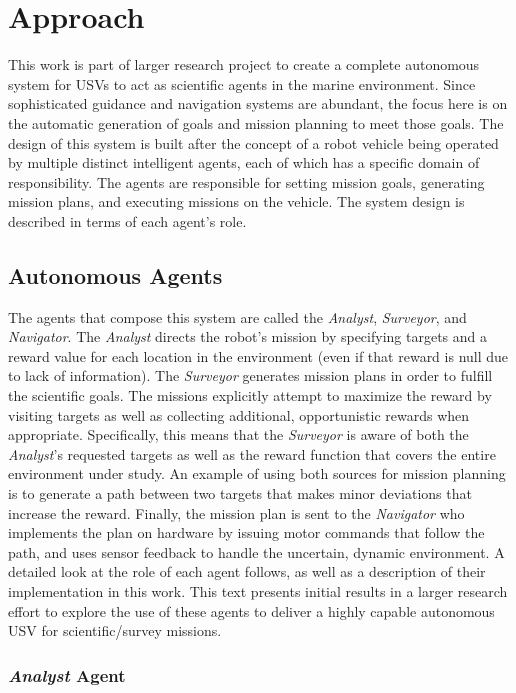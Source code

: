 \documentclass{tamuccthesis}
\begin{document}
\section{Approach}

This work is part of larger research project to create a complete autonomous system for USVs to act as scientific agents in the marine environment. Since sophisticated guidance and navigation systems are abundant, the focus here is on the automatic generation of goals and mission planning to meet those goals. The design of this system is built after the concept of a robot vehicle being operated by multiple distinct intelligent agents, each of which has a specific domain of responsibility. The agents are responsible for setting mission goals, generating mission plans, and executing missions on the vehicle. The system design is described in terms of each agent's role.

\subsection{Autonomous Agents}

The agents that compose this system are called the \textit{Analyst}, \textit{Surveyor}, and \textit{Navigator}. The \textit{Analyst} directs the robot's mission by specifying targets and a reward value for each location in the environment (even if that reward is null due to lack of information). The \textit{Surveyor} generates mission plans in order to fulfill the scientific goals. The missions explicitly attempt to maximize the reward by visiting targets as well as collecting additional, opportunistic rewards when appropriate. Specifically, this means that the \textit{Surveyor} is aware of both the \textit{Analyst}'s requested targets as well as the reward function that covers the entire environment under study. An example of using both sources for mission planning is to generate a path between two targets that makes minor deviations that increase the reward. Finally, the mission plan is sent to the \textit{Navigator} who implements the plan on hardware by issuing motor commands that follow the path, and uses sensor feedback to handle the uncertain, dynamic environment. A detailed look at the role of each agent follows, as well as a description of their implementation in this work. This text presents initial results in a larger research effort to explore the use of these agents to deliver a highly capable autonomous USV for scientific/survey missions. 

\subsubsection{\textit{Analyst} Agent}
\end{document}
